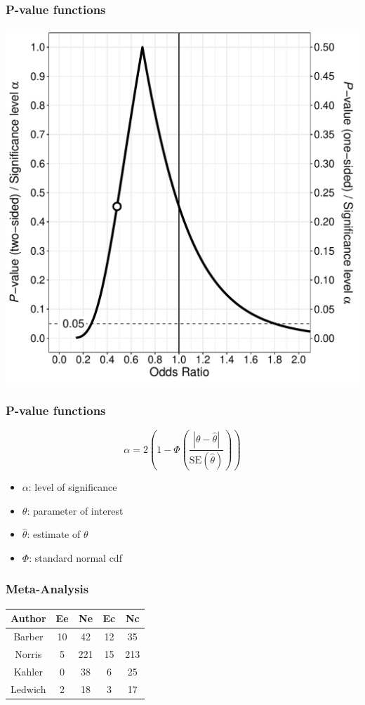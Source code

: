 \documentclass{beamer}
\begin{document}
\begin{frame}
  \frametitle{P-value functions}
  \includegraphics[scale = 0.45]{cd1}
\end{frame}

\begin{frame}
  \frametitle{P-value functions}
  \begin{equation*}
    \alpha = 2\left(1 - \Phi \left(\frac{|\theta - \hat{\theta}|}{\text{SE}(\hat{\theta})}\right) \right)
  \end{equation*}
  \begin{itemize}
    \item $\alpha$: level of significance
    \item $\theta$: parameter of interest
    \item $\hat{\theta}$: estimate of $\theta$
    \item $\Phi$: standard normal cdf
  \end{itemize}
\end{frame}

\begin{frame}
  \frametitle{Meta-Analysis}
  \begin{tabular}{|c | c | c | c | c|}
    \hline
    Author & Ee & Ne & Ec & Nc \\ 
    \hline
    Barber & 10 & 42 & 12 & 35 \\
    Norris & 5 & 221 & 15 & 213 \\
    Kahler & 0 & 38 & 6 & 25 \\
    Ledwich & 2 & 18 & 3 & 17 \\
    \hline
  \end{tabular}
\end{frame}
\end{document}
